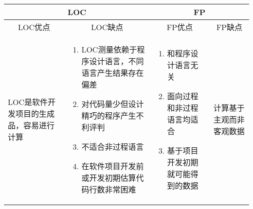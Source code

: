 \vspace{-0.5em}
\begin{spacing}{1.2}
    \centering
    \begin{longtable}{|m{2.5cm}<{\centering}|m{5.5cm}|m{4.5cm}<{\centering}|m{1.7cm}|}
        \hline
        \multicolumn{2}{|c|}{LOC}                                                & \multicolumn{2}{c|}{FP}                               \\ \hline
        \multicolumn{1}{|c|}{LOC优点}                 & \multicolumn{1}{c|}{LOC缺点} & \multicolumn{1}{c|}{FP优点} & \multicolumn{1}{c|}{FP缺点} \\ \hline
        LOC是软件开发项目的生成品，容易进行计算
        & 
        \vspace{-1em}
        \begin{enumerate}[label=\arabic*.,leftmargin=1em]
            \item LOC测量依赖于程序设计语言，不同语言产生结果存在偏差
            \item 对代码量少但设计精巧的程序产生不利评判
            \item 不适合非过程语言
            \item 在软件项目开发前或开发初期估算代码行数非常困难
            \vspace{-1.3em}
        \end{enumerate}                           
        & 
        \vspace{-1em}
        \begin{enumerate}[label=\arabic*.,leftmargin=1em]
            \item 和程序设计语言无关
            \item 面向过程和非过程语言均适合
            \item 基于项目开发初期就可能得到的数据
            \vspace{-1.3em}
        \end{enumerate}    
        & 计算基于主观而非客观数据 \\ \hline
    \end{longtable}
	\end{spacing}
\vspace{-1em}